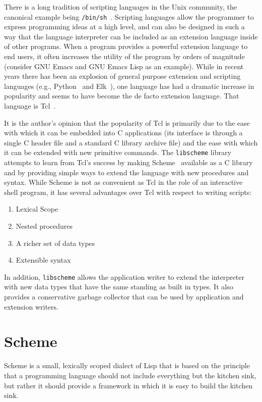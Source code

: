 There is a long tradition of scripting languages in the Unix
community, the canonical example being
\verb+/bin/sh+~\cite{bib:bourne}.  Scripting languages allow the
programmer to express programming ideas at a high level, and can also
be designed in such a way that the language interpreter can be
included as an extension language inside of other programs.  When a
program provides a powerful extension language to end users, it often
increases the utility of the program by orders of magnitude (consider
GNU Emacs and GNU Emacs Lisp as an example).  While in recent years
there has been an explosion of general purpose extension and scripting
languages (e.g., Python~\cite{bib:python} and Elk~\cite{bib:elk}), one
language has had a dramatic increase in popularity and seems to have
become the de facto extension language.  That language is
Tcl~\cite{bib:tcl}.

It is the author's opinion that the popularity of Tcl is primarily due
to the ease with which it can be embedded into C applications (its
interface is through a single C header file and a standard C library
archive file) and the ease with which it can be extended with new
primitive commands.  The \verb+libscheme+ library attempts to learn
from Tcl's success by making Scheme~\cite{bib:scheme} available as a C
library and by providing simple ways to extend the language with new
procedures and syntax.  While Scheme is not as convenient as Tcl in
the role of an interactive shell program, it has several advantages
over Tcl with respect to writing scripts:

\begin{enumerate}
\item Lexical Scope
\item Nested procedures
\item A richer set of data types
\item Extensible syntax
\end{enumerate}

In addition, \verb+libscheme+ allows the application writer to extend
the interpreter with new data types that have the same standing as
built in types.  It also provides a conservative garbage collector
that can be used by application and extension writers.

\section{Scheme}

Scheme is a small, lexically scoped dialect of Lisp that is based on
the principle that a programming language should not include
everything but the kitchen sink, but rather it should provide a
framework in which it is easy to build the kitchen sink.

